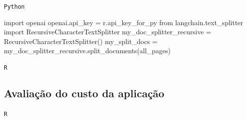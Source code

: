 \documentclass[
  letterpaper,
  DIV=11,
  numbers=noendperiod]{scrartcl}
\newenvironment{Shaded}{\begin{snugshade}}{\end{snugshade}}
\newcommand{\FunctionTok}[1]{\textcolor[rgb]{0.28,0.35,0.67}{#1}}
\newcommand{\ImportTok}[1]{\textcolor[rgb]{0.00,0.46,0.62}{#1}}
\newcommand{\NormalTok}[1]{\textcolor[rgb]{0.00,0.23,0.31}{#1}}
\newcommand{\OperatorTok}[1]{\textcolor[rgb]{0.37,0.37,0.37}{#1}}
\newcommand{\OtherTok}[1]{\textcolor[rgb]{0.00,0.23,0.31}{#1}}
\newcommand{\SpecialCharTok}[1]{\textcolor[rgb]{0.37,0.37,0.37}{#1}}
\begin{document}
\begin{codelisting}

\caption{\texttt{Python}}

\begin{Shaded}
\begin{Highlighting}[]
\ImportTok{import}\NormalTok{ openai}
\NormalTok{openai.api\_key }\OperatorTok{=}\NormalTok{ r.api\_key\_for\_py  }
\ImportTok{from}\NormalTok{ langchain.text\_splitter }\ImportTok{import}\NormalTok{ RecursiveCharacterTextSplitter}
\NormalTok{my\_doc\_splitter\_recursive }\OperatorTok{=}\NormalTok{ RecursiveCharacterTextSplitter()}
\NormalTok{my\_split\_docs }\OperatorTok{=}\NormalTok{ my\_doc\_splitter\_recursive.split\_documents(all\_pages)}
\end{Highlighting}
\end{Shaded}

\end{codelisting}

\begin{codelisting}

\caption{\texttt{R}}

\begin{Shaded}
\end{Shaded}

\end{codelisting}

\hypertarget{avaliauxe7uxe3o-do-custo-da-aplicauxe7uxe3o}{%
\subsection{Avaliação do custo da
aplicação}\label{avaliauxe7uxe3o-do-custo-da-aplicauxe7uxe3o}}

\begin{codelisting}

\caption{\texttt{R}}

\begin{Shaded}
\end{Shaded}

\end{codelisting}
\end{document}

